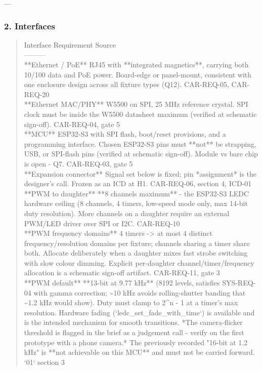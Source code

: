 \documentclass[11pt,a4paper]{article}
\begin{document}
---

\subsubsection*{2. Interfaces}
\begin{quote}\small\ttfamily\raggedright
\textbar{} Interface \textbar{} Requirement \textbar{} Source \textbar{}\\
\textbar{}---\textbar{}---\textbar{}---\textbar{}\\
\textbar{} {*}{*}Ethernet / PoE{*}{*} \textbar{} RJ45 with {*}{*}integrated magnetics{*}{*}, carrying both 10/100 data and PoE power. Board-edge or panel-mount, consistent with one enclosure design across all fixture types (Q12). \textbar{} CAR-REQ-05, CAR-REQ-20 \textbar{}\\
\textbar{} {*}{*}Ethernet MAC/PHY{*}{*} \textbar{} W5500 on SPI, 25 MHz reference crystal. SPI clock must be inside the W5500 datasheet maximum (verified at schematic sign-off). \textbar{} CAR-REQ-04, gate 5 \textbar{}\\
\textbar{} {*}{*}MCU{*}{*} \textbar{} ESP32-S3 with SPI flash, boot/reset provisions, and a programming interface. Chosen ESP32-S3 pins must {*}{*}not{*}{*} be strapping, USB, or SPI-flash pins (verified at schematic sign-off). Module vs bare chip is open - Q7. \textbar{} CAR-REQ-03, gate 5 \textbar{}\\
\textbar{} {*}{*}Expansion connector{*}{*} \textbar{} Signal set below is fixed; pin {*}assignment{*} is the designer's call. Frozen as an ICD at H1. \textbar{} CAR-REQ-06, section 4, ICD-01 \textbar{}\\
\textbar{} {*}{*}PWM to daughter{*}{*} \textbar{} {*}{*}8 channels maximum{*}{*} - the ESP32-S3 LEDC hardware ceiling (8 channels, 4 timers, low-speed mode only, max 14-bit duty resolution). More channels on a daughter require an external PWM/LED driver over SPI or I2C. \textbar{} CAR-REQ-10 \textbar{}\\
\textbar{} {*}{*}PWM frequency domains{*}{*} \textbar{} 4 timers -\textgreater{} at most 4 distinct frequency/resolution domains per fixture; channels sharing a timer share both. Allocate deliberately when a daughter mixes fast strobe switching with slow colour dimming. Explicit per-daughter channel/timer/frequency allocation is a schematic sign-off artifact. \textbar{} CAR-REQ-11, gate 3 \textbar{}\\
\textbar{} {*}{*}PWM default{*}{*} \textbar{} {*}{*}13-bit at 9.77 kHz{*}{*} (8192 levels, satisfies SYS-REQ-04 with gamma correction; \textasciitilde{}10 kHz avoids rolling-shutter banding that \textasciitilde{}1.2 kHz would show). Duty must clamp to 2\textasciicircum{}n - 1 at a timer's max resolution. Hardware fading (`ledc\_set\_fade\_with\_time`) is available and is the intended mechanism for smooth transitions. {*}The camera-flicker threshold is flagged in the brief as a judgement call - verify on the first prototype with a phone camera.{*} The previously recorded "16-bit at 1.2 kHz" is {*}{*}not achievable on this MCU{*}{*} and must not be carried forward. \textbar{} `01` section 3 \textbar{}\\

\end{quote}
\end{document}
